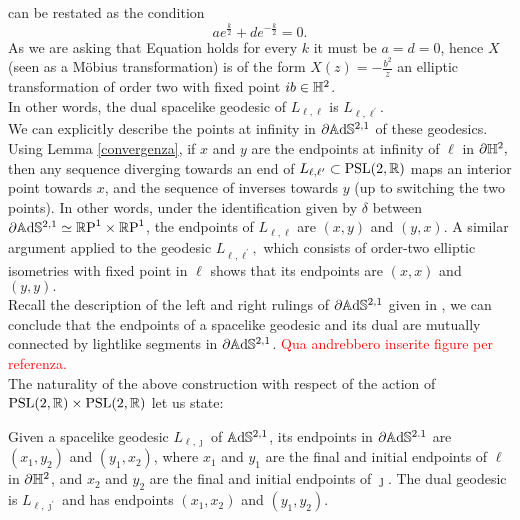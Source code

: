 can be restated as the condition \begin{equation}\label{ellittichine} 
    ae^{\frac{k}{2}}+de^{-\frac{k}{2}}=0.
\end{equation}
As we are asking that Equation  holds for every $k$ it must be $a=d=0$, hence $X$ (seen as a Möbius transformation) is of the form $X(z)=-\frac{b^2}{z}$ an elliptic transformation of order two with fixed point $ib\in \mathbb{H}^2$.\\
In other words, the dual spacelike geodesic of $L_{\ell,\ell}$ is $L_{\ell,\ell^{\prime}}.$\\
We can explicitly describe the points at infinity in $\partial\mathbb{A}\mathrm{d}\mathbb{S}^{2,1}$ of these geodesics. Using Lemma \ref{convergenza}, if $x$ and $y$ are the endpoints at infinity of $\ell$ in $\partial\mathbb{H}^2,$ then any sequence diverging towards an end of $L_{\ell,\ell^{\prime}}\subset \text{PSL}(2,\mathbb{R})$ maps an interior point towards $x$, and the sequence of inverses towards $y$ (up to switching the two points). In other words, under the identification given by $\delta$ between $\partial\mathbb{A}\mathrm{d}\mathbb{S}^{2,1}\simeq\mathbb{R}\text{P}^1\times\mathbb{R}\text{P}^1$, the endpoints of $L_{\ell,\ell}$ are $(x,y)$ and $(y,x)$. A similar argument applied to the geodesic $L_{\ell,\ell^{\prime} },$ which consists of order-two elliptic isometries with fixed point in $\ell$ shows that its endpoints are $(x,x)$ and $(y,y).$\\
Recall the description of the left and right rulings of $\partial\mathbb{A}\mathrm{d}\mathbb{S}^{2,1}$ given in , we can conclude that the endpoints of a spacelike geodesic and its dual are mutually connected by lightlike segments in $\partial\mathbb{A}\mathrm{d}\mathbb{S}^{2,1}$. \textcolor{red}{Qua andrebbero inserite figure per referenza.}\\
The naturality of the above construction with respect of the action of $\text{PSL}(2,\mathbb{R})\times\text{PSL}(2,\mathbb{R})$ let us state: 
\begin{proposition}\label{355}
    Given a spacelike geodesic $L_{\ell,\jmath}$ of $\mathbb{A}\mathrm{d}\mathbb{S}^{2,1}$, its endpoints in $\partial \mathbb{A}\mathrm{d}\mathbb{S}^{2.1}$ are $(x_1,y_2)$ and $(y_1,x_2)$, where $x_1$ and $y_1$ are the final and initial endpoints of $\ell$ in $\partial\mathbb{H}^2$, and $x_2$ and $y_2$ are the final and initial endpoints of $\jmath$. The dual geodesic is $L_{\ell,\jmath^{\prime}}$ and has endpoints $(x_1,x_2)$ and $(y_1,y_2).$
\end{proposition}


